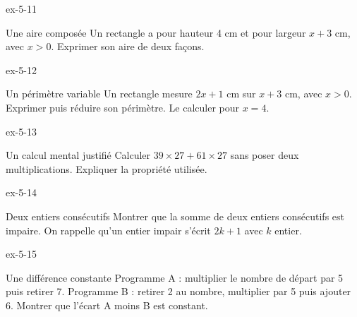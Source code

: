 \begin{blocLivre}{ex-5-11}\begin{exercice}[3]{Une aire composée}
Un rectangle a pour hauteur 4 cm et pour largeur $x+3$ cm, avec $x>0$. Exprimer son aire de deux façons.
\label{fig-ex-5-11}
\end{exercice}\end{blocLivre}
\begin{blocLivre}{ex-5-12}\begin{exercice}[3]{Un périmètre variable}
Un rectangle mesure $2x+1$ cm sur $x+3$ cm, avec $x>0$. Exprimer puis réduire son périmètre. Le calculer pour $x=4$.
\label{fig-ex-5-12}
\end{exercice}\end{blocLivre}
\begin{blocLivre}{ex-5-13}\begin{exercice}[3]{Un calcul mental justifié}
Calculer $39\times27+61\times27$ sans poser deux multiplications. Expliquer la propriété utilisée.
\end{exercice}\end{blocLivre}
\begin{blocLivre}{ex-5-14}\begin{exercice}[3]{Deux entiers consécutifs}
Montrer que la somme de deux entiers consécutifs est impaire. On rappelle qu’un entier impair s’écrit $2k+1$ avec $k$ entier.
\end{exercice}\end{blocLivre}
\begin{blocLivre}{ex-5-15}\begin{exercice}[3]{Une différence constante}
Programme A : multiplier le nombre de départ par 5 puis retirer 7. Programme B : retirer 2 au nombre, multiplier par 5 puis ajouter 6. Montrer que l’écart A moins B est constant.
\end{exercice}\end{blocLivre}

\clearpage
